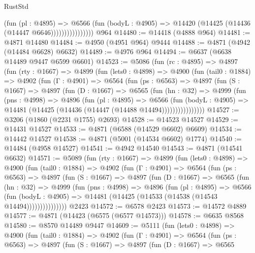 \begin{lexlean}{RustStd}
\begin{coremodule}
                          (fun (pl : @4895) =>
                          @6566
                            (fun (bodyL : @4905) =>
                            @14420 (@14425 (@14436 (@14447 @6646))))))))))))))))
    @964
@14480 := @14418 (@4888 @964)
@14481 := @4871 @14480
@14484 := @4950 (@4951 @964) @9444
@14488 := @4871 (@4942 (@14484 @6628) @6632)
@14489 := @4976 @964
@14494 := @6637 (@6638 @14489 @9447 @6599 @6601)
@14523 := @5086
    (fun (rc : @4895) =>
    @4897
      (fun (rty : @1667) =>
      @4899
        (fun (lets0 : @4898) =>
        @4900
          (fun (tail0 : @1884) =>
          @4902
            (fun (Γ : @4901) =>
            @6564
              (fun (ps : @6563) =>
              @4897
                (fun (S : @1667) =>
                @4897
                  (fun (D : @1667) =>
                  @6565
                    (fun (hn : @32) =>
                    @4999
                      (fun (pns : @4998) =>
                      @4896
                        (fun (pl : @4895) =>
                        @6566
                          (fun (bodyL : @4905) =>
                          @14481 (@14425 (@14436 (@14447 (@14488 @14494))))))))))))))))
@14527 := @3206 (@1860 (@2231 @1755) @2693)
@14528 := @14523 @14527
@14529 := @14431 @14527
@14533 := @4871 (@6588 (@14529 @6602) @6609)
@14534 := @14442 @14527
@14538 := @4871 (@5001 (@14534 @6602) @1774)
@14540 := @14484 (@4958 @14527)
@14541 := @4942 @14540
@14543 := @4871 (@14541 @6632)
@14571 := @5089
    (fun (rty : @1667) =>
    @4899
      (fun (lets0 : @4898) =>
      @4900
        (fun (tail0 : @1884) =>
        @4902
          (fun (Γ : @4901) =>
          @6564
            (fun (ps : @6563) =>
            @4897
              (fun (S : @1667) =>
              @4897
                (fun (D : @1667) =>
                @6565
                  (fun (hn : @32) =>
                  @4999
                    (fun (pns : @4998) =>
                    @4896
                      (fun (pl : @4895) =>
                      @6566
                        (fun (bodyL : @4905) =>
                        @14481 (@14425 (@14533 (@14538 (@14543 @14494)))))))))))))))
    @2423
@14572 := @6578 @2423
@14573 := @14572 @4889
@14577 := @4871 (@14423 (@6575 (@6577 @14573)))
@14578 := @6635 @8568
@14580 := @8570 @14489 @9447
@14609 := @5111
    (fun (lets0 : @4898) =>
    @4900
      (fun (tail0 : @1884) =>
      @4902
        (fun (Γ : @4901) =>
        @6564
          (fun (ps : @6563) =>
          @4897
            (fun (S : @1667) =>
            @4897
              (fun (D : @1667) =>
              @6565

\end{coremodule}
\end{lexlean}
